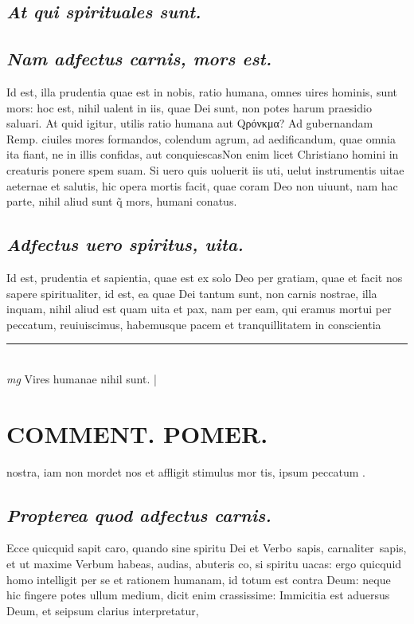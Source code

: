 \documentclass{article}
\begin{document}
\begin{pages}
\subsection*{\textit{At qui spirituales sunt. }}
{}
\subsection*{\textit{Nam adfectus carnis, mors est. }}\pstart Id est, illa prudentia quae est in nobis, ratio humana, omnes uires hominis, sunt mors: hoc est, nihil ualent in iis, quae Dei sunt, non potes harum praesidio saluari. At quid igitur, utilis ratio humana aut Qρόνκμα? Ad gubernandam Remp. ciuiles mores formandos, colendum agrum, ad aedificandum, quae omnia ita fiant, ne in illis confidas, aut conquiescasNon enim licet Christiano homini in creaturis ponere spem suam. Si uero quis uoluerit iis uti, uelut instrumentis uitae aeternae et salutis, hic opera mortis facit, quae coram Deo non uiuunt, nam hac parte, nihil aliud sunt q̃ mors, humani conatus.   \pend
{}
{}
\subsection*{\textit{Adfectus uero spiritus, uita. }}\pstart Id est, prudentia et sapientia, quae est ex solo Deo per gratiam, quae et facit nos sapere spiritualiter, id est, ea quae Dei tantum sunt, non carnis nostrae, illa inquam, nihil aliud est quam uita et pax, nam per eam, qui eramus mortui per peccatum, reuiuiscimus, habemusque pacem et tranquillitatem in conscientia  \pend
\vspace{0.5cm}\noindent
\vspace{0.2cm}\rule{1cm}{0.2pt}\\ 
\hspace{0.2cm}\textit{mg}
\footnotesize Vires humanae nihil sunt.  
\normalsize| 
\section*{COMMENT. POMER.  }\pstart nostra, iam non mordet nos et affligit stimulus mor tis, ipsum peccatum .  \pend
{}
{}
\subsection*{\textit{Propterea quod adfectus carnis. }}\pstart Ecce quicquid sapit caro, quando sine spiritu Dei et Verbo sapis, carnaliter sapis, et ut maxime Verbum habeas, audias, abuteris co, si spiritu uacas: ergo quicquid homo intelligit per se et rationem humanam, id totum est contra Deum: neque hic fingere potes ullum medium, dicit enim crassissime: Immicitia est aduersus Deum, et seipsum clarius interpretatur,  \pend
{}
{}

\end{pages}
\end{document}
